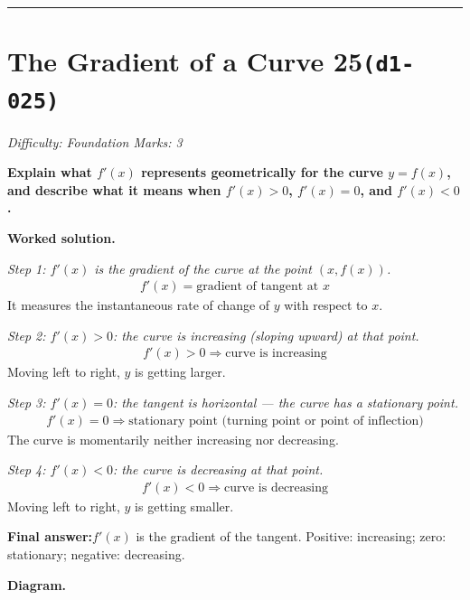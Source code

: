 \documentclass[11pt]{article}
\newcommand{\question}[1]{\par\medskip\noindent\textbf{#1}\par}
\begin{document}
\medskip\hrule

\section*{The Gradient of a Curve 25\quad\small\texttt{(d1-025)}}
\textit{Difficulty: Foundation \quad\textbar\quad Marks: 3}

\question{Explain what \( f'(x) \) represents geometrically for the curve \( y = f(x) \), and describe what it means when \( f'(x) > 0 \), \( f'(x) = 0 \), and \( f'(x) < 0 \).}

\textbf{Worked solution.}

\textit{Step 1: \( f'(x) \) is the gradient of the curve at the point \( (x, f(x)) \).}
\[\begin{gathered}
f'(x) = \text{gradient of tangent at } x
\end{gathered}\]
It measures the instantaneous rate of change of \( y \) with respect to \( x \).

\textit{Step 2: \( f'(x) > 0 \): the curve is increasing (sloping upward) at that point.}
\[\begin{gathered}
f'(x) > 0 \Rightarrow \text{curve is increasing}
\end{gathered}\]
Moving left to right, \( y \) is getting larger.

\textit{Step 3: \( f'(x) = 0 \): the tangent is horizontal --- the curve has a stationary point.}
\[\begin{gathered}
f'(x) = 0 \Rightarrow \text{stationary point (turning point or point of inflection)}
\end{gathered}\]
The curve is momentarily neither increasing nor decreasing.

\textit{Step 4: \( f'(x) < 0 \): the curve is decreasing at that point.}
\[\begin{gathered}
f'(x) < 0 \Rightarrow \text{curve is decreasing}
\end{gathered}\]
Moving left to right, \( y \) is getting smaller.

\begin{answerbox}
\textbf{Final answer:}\quad \(\displaystyle  f'(x) \) is the gradient of the tangent. Positive: increasing; zero: stationary; negative: decreasing.
\end{answerbox}
\textbf{Diagram.}
\end{document}
